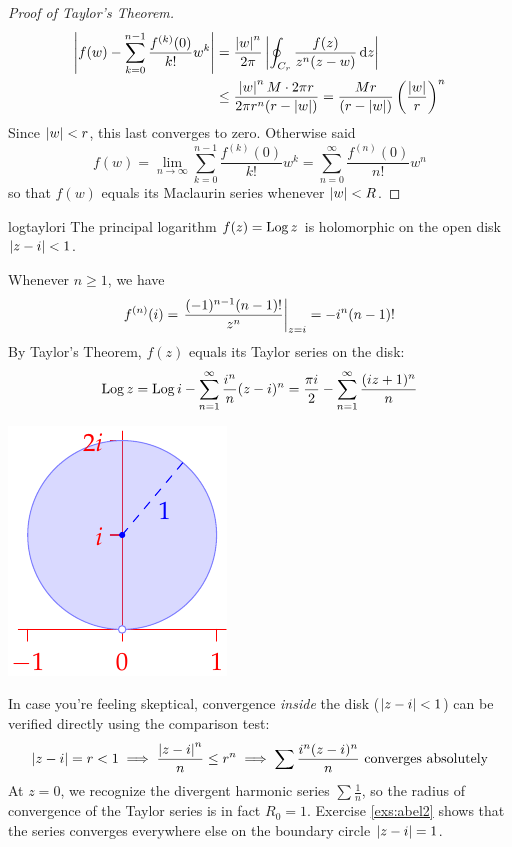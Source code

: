 \begin{proof}[Proof of Taylor's Theorem]
	\begin{align*}
		\left| f(w)-\sum_{k=0}^{n-1} \frac{f^{(k)}(0)}{k!}w^k\right|
			&=\frac{\left| w\right|^n}{2\pi}\left| \oint_{C_r}\frac{f(z)}{z^n(z-w)}\,{\mathrm{d} z}\right|\\
			&\le\frac{\left| w\right|^nM\cdot 2\pi r}{2\pi r^n(r-\left| w\right|)}
				=\frac{Mr}{(r-\left| w\right|)}\left(\frac{\left| w\right|}r\right)^n 
	\end{align*}
	Since $\left| w\right|<r$, this last converges to zero. Otherwise said
	\[
		f(w)=\lim_{n\to\infty}\sum_{k=0}^{n-1} \frac{f^{(k)}(0)}{k!}w^k 
		=\sum_{n=0}^{\infty} \frac{f^{(n)}(0)}{n!}w^n
	\]
	so that $f(w)$ equals its Maclaurin series whenever $\left| w\right|<R$.
\end{proof}


\begin{example}{}{logtaylori}
	The principal logarithm $f(z)=\operatorname{Log} z$ is holomorphic on the open disk $\left| z-i\right|<1$.\par
  \begin{minipage}[t]{0.7\linewidth}\vspace{0pt}
  	Whenever $n\ge 1$, we have
		\[
			f^{(n)}(i)
			=\left.\frac{(-1)^{n-1}(n-1)!}{z^{n}}\right|_{z=i}
			=-i^n(n-1)!
		\]
		By Taylor's Theorem, $f(z)$ equals its Taylor series on the disk:
  	\[
  		\operatorname{Log} z=\operatorname{Log} i-\sum_{n=1}^\infty \frac{i^n}{n}(z-i)^n =\frac{\pi i}2-\sum_{n=1}^\infty \frac{(iz+1)^n}n
  	\]
  \end{minipage}
  \hfill
  \begin{minipage}[t]{0.29\linewidth}\vspace{0pt}
  	\flushright\includegraphics{taylorex2}
  \end{minipage}\medbreak
  
	In case you're feeling skeptical, convergence \emph{inside} the disk ($\left| z-i\right|<1$) can be verified directly using the comparison test:
	\[
		\left| z-i\right|=r<1\implies\frac{\left| z-i\right|^n}n\le r^n\implies \sum\frac{i^n(z-i)^n}n\text{ converges absolutely}
	\]
	At $z=0$, we recognize the divergent harmonic series $\sum \frac 1n$, so the radius of convergence of the Taylor series is in fact $R_0=1$. Exercise \ref{exs:abel2} shows that the series converges everywhere else on the boundary circle $\left| z-i\right|=1$.
\end{example}


